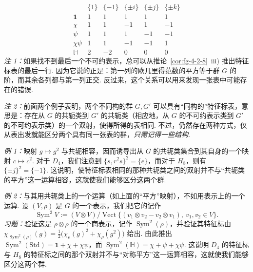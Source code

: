 \begin{numpara}[特征标表]
\[
\begin{array}{c|c|c|c|c|c}
 & \{1\} & \{-1\} & \{\pm i\} & \{\pm j\} & \{\pm k\}\\\hline
\mathbf{1} & 1 & 1 & 1 & 1 & 1\\\hline
\chi & 1 & 1 & -1 & 1 & -1\\\hline
\psi & 1 & 1 & 1 & -1 & -1\\\hline
\chi\psi & 1 & 1 & -1 & -1 & 1\\\hline
\mathbb{H} & 2 & -2 & 0 & 0 & 0
\end{array}
\]
\emph{注 1：}如果找不到最后一个不可约表示，总可以从推论~\ref{cor:fg-4-2-8}~iii) 推出特征标表的最后一行. 因为它说的正是：第一列的欧几里得范数的平方等于群 $G$ 的阶，而其余各列都与第一列正交. 反过来，这个关系可以用来发现一张表中可能存在的错误.

\emph{注 2：}前面两个例子表明，两个不同构的群 $G,G'$ 可以具有``同构的''特征标表，意思是：存在从 $G$ 的共轭类到 $G'$ 的共轭类（相应地，从 $G$ 的不可约表示类到 $G'$ 的不可约表示类）的一个双射，使得所得的表相同. 不过，仍然存在两种方式，仅从表出发就能区分两个具有同一张表的群，\emph{只需记得一些结构}.

\emph{例 1：}映射 $g\mapsto g^2$ 与共轭相容，因而诱导出从 $G$ 的共轭类集合到其自身的一个映射 $c\mapsto c^2$. 对于 $D_4$，我们注意到 $\{s,r^2s\}^2=\{e\}$，而对于 $H_8$，则有 $\{\pm j\}^2=\{-1\}$. 这说明，使特征标表相同的那种共轭类之间的双射并不与``共轭类的平方''这一运算相容，这就使我们能够区分这两个群.

\emph{例 2：}与其用共轭类上的一个运算（如上面的``平方''映射），不如用表示上的一个运算. 设 $(V,\rho)$ 是 $G$ 的一个表示，我们把它的记作
\[
\operatorname{Sym}^2V:=(V\otimes V)\big/\operatorname{Vect}\{(v_1\otimes v_2-v_2\otimes v_1),\ v_1,v_2\in V\}.
\]
\emph{习题：}验证这是 $\rho\otimes\rho$ 的一个商表示，记作 $\operatorname{Sym}^2(\rho)$，并验证其特征标由 $\chi_{\operatorname{Sym}^2(\rho)}(g)=\frac{1}{2}\bigl(\chi_\rho(g)^2+\chi_\rho(g^2)\bigr)$ 给出. 由此推出 $\operatorname{Sym}^2(\mathrm{Std})=\mathbf{1}+\chi+\chi\psi$，而 $\operatorname{Sym}^2(\mathbb{H})=\chi+\psi+\chi\psi$. 这说明 $D_4$ 的特征标与 $H_8$ 的特征标之间的那个双射并不与``对称平方''这一运算相容，这就使我们能够区分这两个群.
\end{numpara}

